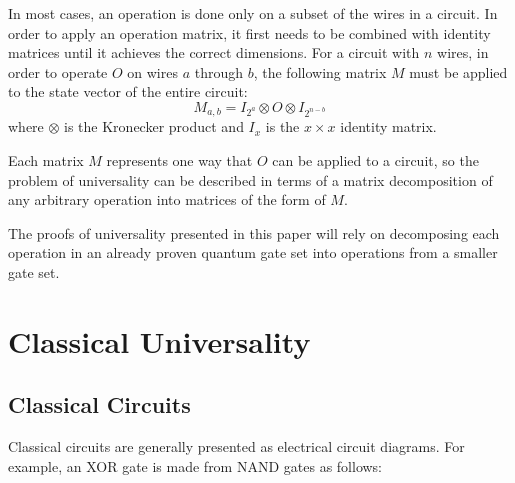 \documentclass[12pt]{article}
\begin{document}
In most cases, an operation is done only on a subset of the wires in a circuit. In order to apply an operation matrix, it first needs to be combined with identity matrices until it achieves the correct dimensions. For a circuit with $n$ wires, in order to operate $O$ on wires $a$ through $b$, the following matrix $M$ must be applied to the state vector of the entire circuit:
$$
M_{a, b} = I_{2^a} \otimes O \otimes I_{2^{n - b}}
$$
where $\otimes$ is the Kronecker product and $I_x$ is the $x \times x$ identity matrix.

Each matrix $M$ represents one way that $O$ can be applied to a circuit, so the problem of universality can be described in terms of a matrix decomposition of any arbitrary operation into matrices of the form of $M$.

The proofs of universality presented in this paper will rely on decomposing each operation in an already proven quantum gate set into operations from a smaller gate set.

\section{Classical Universality}
\subsection{Classical Circuits}
Classical circuits are generally presented as electrical circuit diagrams. For example, an XOR gate is made from NAND gates as follows:
\end{document}
